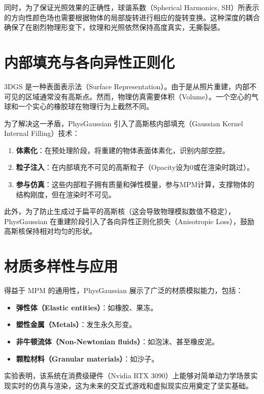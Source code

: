 同时，为了保证光照效果的正确性，球谐系数（Spherical Harmonics, SH）所表示的方向性颜色场也需要根据物体的局部旋转进行相应的旋转变换\cite{xie2023physgaussian_arxiv,xie2024physgaussian_cvpr}。这种深度的耦合确保了在剧烈物理形变下，纹理和光照依然保持高度真实，无撕裂感。

\section{内部填充与各向异性正则化}
3DGS 是一种表面表示法（Surface Representation）。由于是从照片重建，内部不可见的区域通常没有高斯点。然而，物理仿真需要体积（Volume）。一个空心的气球和一个实心的橡胶球在物理行为上截然不同。

为了解决这一矛盾，PhysGaussian 引入了高斯核内部填充（Gaussian Kernel Internal Filling）技术\cite{xie2023physgaussian_arxiv,xie2024physgaussian_cvpr}：
\begin{enumerate}
	\item \textbf{体素化}：在预处理阶段，将重建的物体表面体素化，识别内部空腔。
	\item \textbf{粒子注入}：在内部填充不可见的高斯粒子（Opacity设为0或在渲染时跳过）。
	\item \textbf{参与仿真}：这些内部粒子拥有质量和弹性模量，参与MPM计算，支撑物体的结构刚度，但在渲染时不可见\cite{wu2025survey}。
\end{enumerate}

此外，为了防止生成过于扁平的高斯核（这会导致物理模拟数值不稳定），PhysGaussian 在重建阶段引入了各向异性正则化损失（Anisotropic Loss），鼓励高斯核保持相对均匀的形状\cite{lin2023gaussianflow_arxiv}。

\section{材质多样性与应用}
得益于 MPM 的通用性，PhysGaussian 展示了广泛的材质模拟能力，包括：
\begin{itemize}
	\item \textbf{弹性体（Elastic entities）}：如橡胶、果冻。
	\item \textbf{塑性金属（Metals）}：发生永久形变。
	\item \textbf{非牛顿流体（Non-Newtonian fluids）}：如泡沫、甚至橡皮泥。
	\item \textbf{颗粒材料（Granular materials）}：如沙子\cite{xie2024physgaussian_cvpr}。
\end{itemize}

实验表明，该系统在消费级硬件（Nvidia RTX 3090）上能够对简单动力学场景实现实时的仿真与渲染\cite{wu2025survey}，这为未来的交互式游戏和虚拟现实应用奠定了坚实基础。